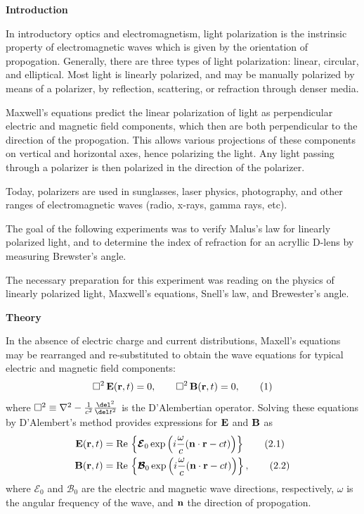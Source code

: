 \documentclass[11pt]{article}
\begin{document}
\begin{multicols}{2}


     \selectfont \textbf{Introduction}
    
     \selectfont 
    
    In introductory optics and electromagnetism, light polarization is the instrinsic property of electromagnetic waves which is given by the orientation of propogation. Generally, there are three types of light polarization: linear, circular, and elliptical. Most light is linearly polarized, and may be manually polarized by means of a polarizer, by reflection, scattering, or refraction through denser media. 
    
    Maxwell's equations predict the linear polarization of light as perpendicular electric and magnetic field components, which then are both perpendicular to the direction of the propogation. This allows various projections of these components on vertical and horizontal axes, hence polarizing the light. Any light passing through a polarizer is then polarized in the direction of the polarizer. 

    Today, polarizers are used in sunglasses, laser physics, photography, and other ranges of electromagnetic waves (radio, x-rays, gamma rays, etc). 
    
    The goal of the following experiments was to verify Malus's law for linearly polarized light, and to determine the index of refraction for an acryllic D-lens by measuring Brewster's angle. 

    The necessary preparation for this experiment was reading on the physics of linearly polarized light, Maxwell's equations, Snell's law, and Brewester's angle. 
    
    
    \vspace{10pt}

     \selectfont \textbf{Theory}
    
     \selectfont In the absence of electric charge and current distributions, Maxell's equations may be rearranged and re-substituted to obtain the wave equations for typical electric and magnetic field components:
    \[
        \square^2\, {\bf{E}}({\bf{r}}, t) = 0, \qquad \square^2\, {\bf{B}}({\bf{r}}, t) = 0, \tag{1}
    \]
    \nd where $\square^2 \equiv \nabla^2 - \frac{1}{c^2}\frac{\del^2}{\del t^2}$ is the D'Alembertian operator. Solving these equations by D'Alembert's method provides expressions for ${\bf{E}}$ and ${\bf{B}}$ as
    \begin{align*}
        {\bf{E}}({\bf{r}}, t) &= \text{Re}\,\left\{\boldsymbol{\mathcal{E}}_0\exp\left(i\frac{\omega}{c}({\bf{n}}\cdot {\bf{r}} - ct)\right)\right\} \tag{2.1}\\
        {\bf{B}}({\bf{r}}, t) &= \text{Re}\,\left\{\boldsymbol{\mathcal{B}}_0\exp\left(i\frac{\omega}{c}({\bf{n}}\cdot {\bf{r}} - ct)\right)\right\}, \tag{2.2}
    \end{align*}
    \nd where $\boldsymbol{\mathcal{E}}_0$ and $\boldsymbol{\mathcal{B}}_0$ are the electric and magnetic wave directions, respectively, $\omega$ is the angular frequency of the wave, and ${\bf{n}}$ the direction of propogation.
    

\end{multicols}
\end{document}
